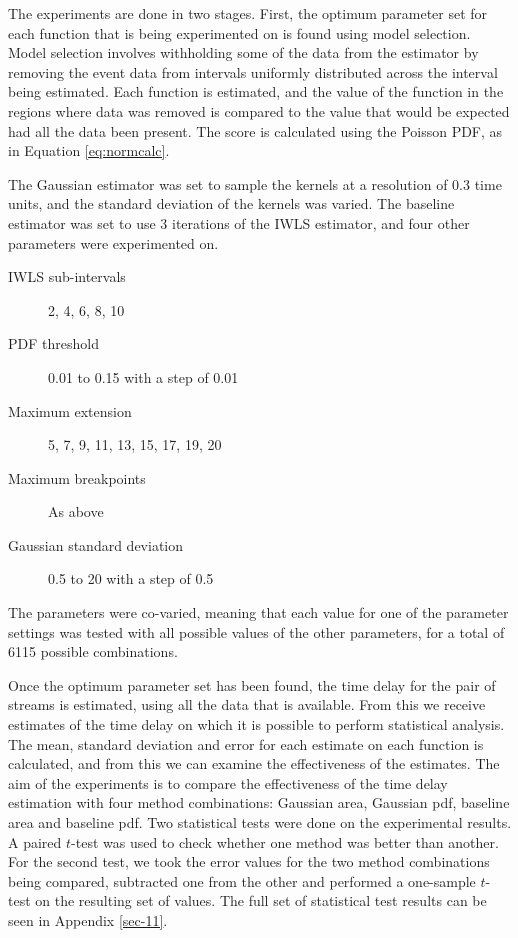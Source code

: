 \documentclass[a4paper,11pt]{article}
\begin{document}
  The experiments are done in two stages. First, the optimum parameter set for
  each function that is being experimented on is found using model
  selection. Model selection involves withholding some of the data from the
  estimator by removing the event data from intervals uniformly distributed
  across the interval being estimated. Each function is estimated, and the value
  of the function in the regions where data was removed is compared to the value
  that would be expected had all the data been present. The score is calculated
  using the Poisson PDF, as in Equation \eqref{eq:normcalc}.

  The Gaussian estimator was set to sample the kernels at a resolution of 0.3
  time units, and the standard deviation of the kernels was varied. The baseline
  estimator was set to use 3 iterations of the IWLS estimator, and four other
  parameters were experimented on.
  \begin{description}
  \item[IWLS sub-intervals] 2, 4, 6, 8, 10
  \item[PDF threshold] 0.01 to 0.15 with a step of 0.01
  \item[Maximum extension] 5, 7, 9, 11, 13, 15, 17, 19, 20
  \item[Maximum breakpoints] As above
  \item[Gaussian standard deviation] 0.5 to 20 with a step of 0.5
  \end{description}
  The parameters were co-varied, meaning that each value for one
  of the parameter settings was tested with all possible values of the other
  parameters, for a total of 6115 possible combinations.

  Once the optimum parameter set has been found, the time delay for the pair of
  streams is estimated, using all the data that is available. From this we
  receive estimates of the time delay on which it is possible to perform
  statistical analysis. The mean, standard deviation and error for each estimate
  on each function is calculated, and from this we can examine the effectiveness
  of the estimates. The aim of the experiments is to compare the effectiveness
  of the time delay estimation with four method combinations: Gaussian area,
  Gaussian pdf, baseline area and baseline pdf. Two statistical tests were done
  on the experimental results. A paired $t$-test was used to check whether one
  method was better than another. For the second test, we took the error values
  for the two method combinations being compared, subtracted one from the other
  and performed a one-sample $t$-test on the resulting set of values. The full
  set of statistical test results can be seen in Appendix \ref{sec-11}.
\end{document}
